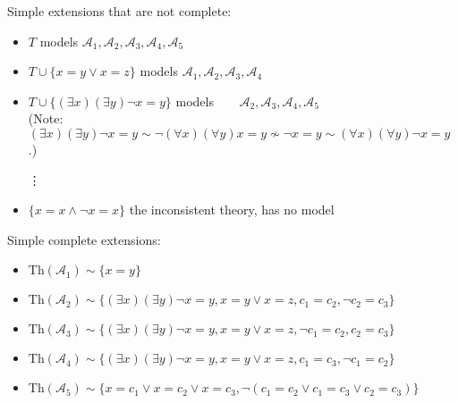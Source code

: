 \begin{problem}
\begin{solution}
\begin{enumerate}[(a)]
            Simple extensions that are not complete:
            \begin{itemize}
                \item $T$ \hfill models $\mathcal A_1,\mathcal A_2,\mathcal A_3,\mathcal A_4,\mathcal A_5$
                \item $T\cup\{x=y\lor x=z\}$ \hfill models $\mathcal A_1,\mathcal A_2,\mathcal A_3,\mathcal A_4\phantom{,\mathcal A_5}$
                \item $T\cup\{(\exists x)(\exists y)\neg x=y\}$ \hfill models $\phantom{\mathcal A_1,}\mathcal A_2,\mathcal A_3,\mathcal A_4,\mathcal A_5$\\
                (Note: $(\exists x)(\exists y)\neg x=y\sim\neg(\forall x)(\forall y)x=y\not\sim\neg x=y\sim(\forall x)(\forall y)\neg x=y$.)
                
                \item[\vdots]
                
                \item $\{x=x\land\neg x=x\}$ \hfill the inconsistent theory, has no model
            \end{itemize}

            Simple complete extensions:
            \begin{itemize}
                \item $\mathrm{Th}(\mathcal A_1)\sim\{x=y\}$
                \item $\mathrm{Th}(\mathcal A_2)\sim\{(\exists x)(\exists y)\neg x=y,x=y\lor x=z,c_1=c_2,\neg c_2=c_3\}$
                \item $\mathrm{Th}(\mathcal A_3)\sim\{(\exists x)(\exists y)\neg x=y,x=y\lor x=z,\neg c_1=c_2,c_2=c_3\}$
                \item $\mathrm{Th}(\mathcal A_4)\sim\{(\exists x)(\exists y)\neg x=y,x=y\lor x=z,c_1=c_3,\neg c_1=c_2\}$
                \item $\mathrm{Th}(\mathcal A_5)\sim\{x=c_1 \vee x=c_2 \vee x=c_3,\neg (c_1=c_2\lor c_1=c_3\lor c_2=c_3)\}$
            \end{itemize}    
            

\end{enumerate}
\end{solution}
\end{problem}
